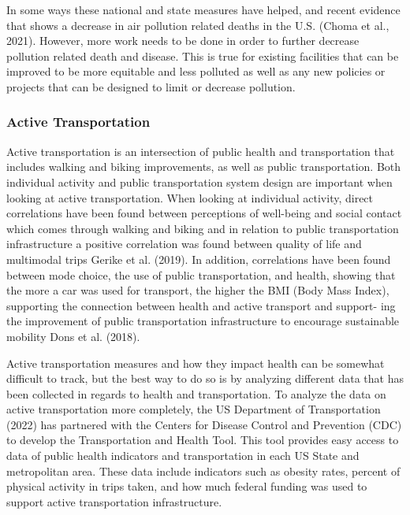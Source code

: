 \documentclass[
  letterpaper,
  authoryear,
  review,
  3p]{elsarticle}
\begin{document}
In some ways these national and state measures have helped, and recent
evidence that shows a decrease in air pollution related deaths in the
U.S. (Choma et al., 2021). However, more work needs to be done in order
to further decrease pollution related death and disease. This is true
for existing facilities that can be improved to be more equitable and
less polluted as well as any new policies or projects that can be
designed to limit or decrease pollution.

\hypertarget{active-transportation}{%
\subsubsection{Active Transportation}\label{active-transportation}}

Active transportation is an intersection of public health and
transportation that includes walking and biking improvements, as well as
public transportation. Both individual activity and public
transportation system design are important when looking at active
transportation. When looking at individual activity, direct correlations
have been found between perceptions of well-being and social contact
which comes through walking and biking and in relation to public
transportation infrastructure a positive correlation was found between
quality of life and multimodal trips Gerike et al. (2019). In addition,
correlations have been found between mode choice, the use of public
transportation, and health, showing that the more a car was used for
transport, the higher the BMI (Body Mass Index), supporting the
connection between health and active transport and support- ing the
improvement of public transportation infrastructure to encourage
sustainable mobility Dons et al. (2018).

Active transportation measures and how they impact health can be
somewhat difficult to track, but the best way to do so is by analyzing
different data that has been collected in regards to health and
transportation. To analyze the data on active transportation more
completely, the US Department of Transportation (2022) has partnered
with the Centers for Disease Control and Prevention (CDC) to develop the
Transportation and Health Tool. This tool provides easy access to data
of public health indicators and transportation in each US State and
metropolitan area. These data include indicators such as obesity rates,
percent of physical activity in trips taken, and how much federal
funding was used to support active transportation infrastructure.
\end{document}
